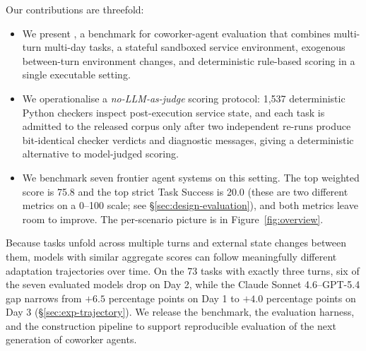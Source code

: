 

Our contributions are threefold:
\begin{itemize}
  \item We present \bench{}, a benchmark for coworker-agent evaluation that combines multi-turn multi-day tasks, a stateful sandboxed service environment, exogenous between-turn environment changes, and deterministic rule-based scoring in a single executable setting.
  \item We operationalise a \emph{no-LLM-as-judge} scoring protocol: 1{,}537 deterministic Python checkers inspect post-execution service state, and each task is admitted to the released corpus only after two independent re-runs produce bit-identical checker verdicts and diagnostic messages, giving a deterministic alternative to model-judged scoring.
  \item We benchmark seven frontier agent systems on this setting. The top weighted score is 75.8 and the top strict Task Success is 20.0 (these are two different metrics on a 0--100 scale; see \S\ref{sec:design-evaluation}), and both metrics leave room to improve. The per-scenario picture is in Figure~\ref{fig:overview}.
\end{itemize}

Because tasks unfold across multiple turns and external state changes between them, models with similar aggregate scores can follow meaningfully different adaptation trajectories over time. On the 73 tasks with exactly three turns, six of the seven evaluated models drop on Day 2, while the Claude Sonnet 4.6--GPT-5.4 gap narrows from $+6.5$ percentage points on Day 1 to $+4.0$ percentage points on Day 3 (\S\ref{sec:exp-trajectory}). We release the benchmark, the evaluation harness, and the construction pipeline to support reproducible evaluation of the next generation of coworker agents.


